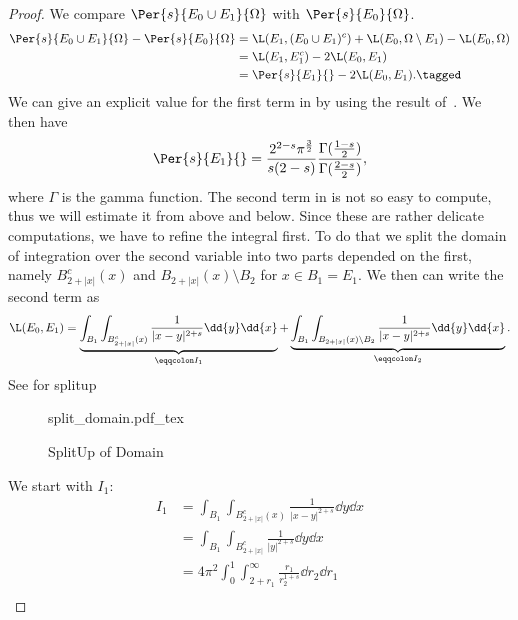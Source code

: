 \begin{proof}
	We compare \( \Per{s}{E_0 \cup E_1}{\Omega} \) with \( \Per{s}{E_0}{\Omega} \).
	\begin{align*}
		\Per{s}{E_0 \cup E_1}{\Omega} - \Per{s}{E_0}{\Omega}
		 & = \L(E_1, (E_0 \cup E_1)^c) + \L(E_0, \Omega \setminus E_1) - \L(E_0, \Omega) \\
		 & = \L(E_1, E_1^c) - 2 \L(E_0, E_1) \\
		 & = \Per{s}{E_1}{} - 2 \L(E_0, E_1). \tagged\label{eq:202}
	\end{align*}
	We can give an explicit value for the first term in  by using the result
	of~\cite[Eq. (11)]{haddad2022affine}. We then have
	\begin{gather*}
		\Per{s}{E_1}{} = \frac{2^{2 - s} \pi^{\frac{3}{2}}}{s(2 - s)} \frac{\Gamma (\frac{1 - s}{2})}{\Gamma (\frac{2 - s}{2})},
	\end{gather*}
	where \( \Gamma \) is the gamma function. The second term in  is not so
	easy to compute, thus we will estimate it from above and below. Since these are rather
	delicate computations, we have to refine the integral first. To do that we split the
	domain of integration over the second variable into two parts depended on the first,
	namely \( B_{2 + \lvert x\rvert}^c (x) \) and \( B_{2 + \lvert x\rvert} (x) \setminus B_2
	\) for \( x \in B_1 = E_1 \). We then can write the second term as
	\begin{gather*}
		\L(E_0, E_1) = \underbrace{\int_{B_1} \int_{B_{2 + \lvert x\rvert}^c (x)} \frac{1}{\lvert x - y \rvert^{2 + s}} \dd{y} \dd{x}}_{\eqqcolon I_1} + \underbrace{\int_{B_1} \int_{B_{2 + \lvert x\rvert} (x) \setminus B_2} \frac{1}{\lvert x - y \rvert^{2 + s}} \dd{y} \dd{x}}_{\eqqcolon I_2}.
	\end{gather*}
	See  for splitup \\
	\begin{figure}[h]
		\centering
		\def\svgwidth{0.5\textwidth}
		{split_domain.pdf_tex}
		\caption{SplitUp of Domain}
		\label{fig:201}
	\end{figure}
	We start with \( I_1 \):
	\begin{align*}
		I_1
		 & = \int_{B_1} \int_{B_{2 + \lvert x\rvert}^c (x)} \frac{1}{\lvert x - y \rvert^{2 + s}} \dd{y} \dd{x} \\
		 & = \int_{B_1} \int_{B_{2 + \lvert x\rvert}^c} \frac{1}{\lvert y \rvert^{2 + s}} \dd{y} \dd{x} \\
		 & = 4 \pi^2 \int_0^1 \int_{2 + r_1}^\infty \frac{r_1}{r_2^{1 + s}} \dd{r_2} \dd{r_1} \\

\end{align*}
\end{proof}
